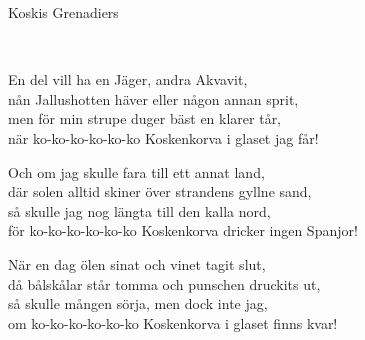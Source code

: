 \begin{song}{Koskis Grenadiers}
	
	\\
	
	En del vill ha en Jäger, andra Akvavit,\\
	nån Jallushotten häver eller någon annan sprit,\\
	men för min strupe duger bäst en klarer tår,\\
	när ko-ko-ko-ko-ko-ko Koskenkorva i glaset jag får!
	
	Och om jag skulle fara till ett annat land,\\
	där solen alltid skiner över strandens gyllne sand,\\
	så skulle jag nog längta till den kalla nord,\\
	för ko-ko-ko-ko-ko-ko Koskenkorva dricker ingen Spanjor!
	
	När en dag ölen sinat och vinet tagit slut,\\
	då bålskålar står tomma och punschen druckits ut,\\
	så skulle mången sörja, men dock inte jag,\\
	om ko-ko-ko-ko-ko-ko Koskenkorva i glaset finns kvar!

\end{song}